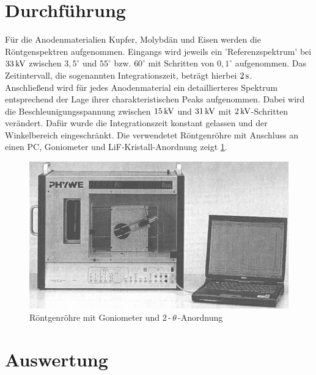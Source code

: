 \documentclass[numbers=noenddot,12pt,a4paper]{scrartcl}
\newcommand{\degree}{^\circ}
\begin{document}
\section{Durchführung}
Für die Anodenmaterialien Kupfer, Molybdän und Eisen werden die Röntgenspektren aufgenommen. Eingangs wird jeweils ein 'Referenzspektrum' bei $\unit[33]{kV}$ zwischen $3,5\degree$ und $55\degree$ bzw. $60\degree$ mit Schritten von $0,1\degree$ aufgenommen. Das Zeitintervall, die sogenannten Integrationszeit, beträgt hierbei $\unit[2]{s}$.\\
Anschließend wird für jedes Anodenmaterial ein detaillierteres Spektrum entsprechend der Lage ihrer charakteristischen Peaks aufgenommen. Dabei wird die Beschleunigungsspannung zwischen $\unit[15]{kV}$ und $\unit[31]{kV}$ mit $\unit[2]{kV}$-Schritten verändert. Dafür wurde die Integrationszeit konstant gelassen und der Winkelbereich eingeschränkt. Die verwendetet Röntgenröhre mit Anschluss an einen PC, Goniometer und LiF-Kristall-Anordnung zeigt \ref{img:aufbau}.
\begin{figure}[H]
	\centering
	\includegraphics[width=\textwidth]{aufbau.png}
	\caption{Röntgenröhre mit Goniometer und $2$\,-\,$\theta$\,-Anordnung} \label{img:aufbau}
\end{figure}
\newpage
\section{Auswertung}
\end{document}
